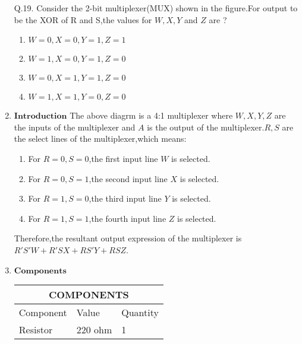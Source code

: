 \documentclass[12pt]{article}
\begin{document}
\begin{enumerate}
Q.19. Consider the 2-bit multiplexer(MUX) shown in the figure.For output to be the XOR of R and S,the values for $ W,X,Y$ and $Z$ are ?\newline
{}
\begin{enumerate}
\item $W = 0, X = 0, Y = 1, Z = 1$
\item $W = 1, X = 0, Y = 1, Z = 0$
\item $W = 0, X = 1, Y = 1, Z = 0$
\item $W = 1, X = 1, Y = 0, Z = 0$
\end{enumerate}
\item $\textbf{Introduction}$ \newline
	The above diagrm is a 4:1 multiplexer where $W, X, Y, Z$ are the inputs of the multiplexer and $A$ is the output of the multiplexer.$R , S$ are the select lines of the multiplexer,which means:\newline
\begin{enumerate}
\item For $R = 0,S = 0$,the first input line $W$ is selected.
\item For $R = 0,S = 1$,the second input line $X$ is selected.
\item For $R = 1,S = 0$,the third input line $Y$ is selected.
\item For $R = 1,S = 1$,the fourth input line $Z$ is selected.
\end{enumerate}
Therefore,the resultant output expression of the multiplexer is $R'S'W + R'SX + RS'Y + RSZ$.
\item $\textbf{Components}$
\label{table:1}\begin{tabular}{|p{5cm}|p{3cm}|p{2cm}|}
	\hline
	\multicolumn{3}{|c|}{COMPONENTS}\\
	\hline
	Component& Value& Quantity\\
	\hline
	Resistor& 220 ohm& 1\\
	\hline

\end{tabular}
\end{enumerate}
\end{document}
